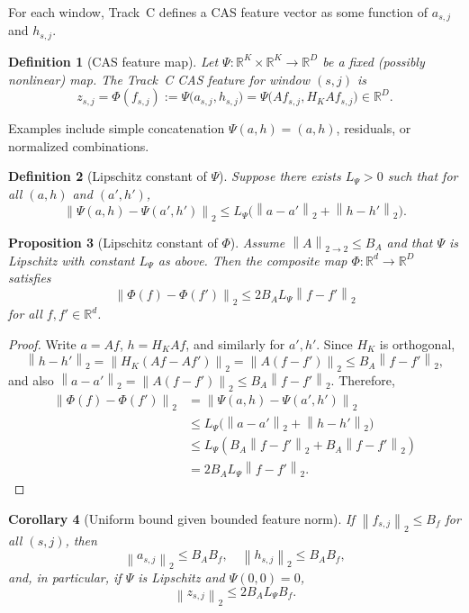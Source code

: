 \documentclass[11pt]{article}
\newtheorem{definition}{Definition}[section]
\newtheorem{proposition}[definition]{Proposition}
\newtheorem{corollary}[definition]{Corollary}
\newcommand{\R}{\mathbb{R}}
\newcommand{\norm}[1]{\left\lVert #1 \right\rVert}
\begin{document}
For each window, Track~C defines a CAS feature vector as some function of \(a_{s,j}\) and \(h_{s,j}\).

\begin{definition}[CAS feature map]
Let \(\Psi : \R^K \times \R^K \to \R^D\) be a fixed (possibly nonlinear) map.
The Track~C CAS feature for window \((s,j)\) is
\[
  z_{s,j} = \Phi(f_{s,j}) := \Psi\bigl(a_{s,j}, h_{s,j}\bigr)
  = \Psi\bigl(A f_{s,j}, H_K A f_{s,j}\bigr) \in \R^D.
\]
\end{definition}

Examples include simple concatenation \(\Psi(a,h) = (a,h)\), residuals, or normalized combinations.

\begin{definition}[Lipschitz constant of \(\Psi\)]
Suppose there exists \(L_\Psi > 0\) such that for all \((a,h)\) and \((a',h')\),
\[
  \norm{\Psi(a,h) - \Psi(a',h')}_2
  \le L_\Psi \bigl( \norm{a-a'}_2 + \norm{h-h'}_2 \bigr).
\]
\end{definition}

\begin{proposition}[Lipschitz constant of \(\Phi\)]
Assume \(\norm{A}_{2\to2} \le B_A\) and that \(\Psi\) is Lipschitz with constant \(L_\Psi\) as above.
Then the composite map \(\Phi : \R^d \to \R^D\) satisfies
\[
  \norm{\Phi(f) - \Phi(f')}_2 \le 2 B_A L_\Psi \norm{f - f'}_2
\]
for all \(f,f' \in \R^d\).
\end{proposition}

\begin{proof}
Write \(a = A f\), \(h = H_K A f\), and similarly for \(a',h'\).
Since \(H_K\) is orthogonal,
\[
  \norm{h - h'}_2 = \norm{H_K(A f - A f')}_2 = \norm{A(f-f')}_2 \le B_A \norm{f-f'}_2,
\]
and also \(\norm{a - a'}_2 = \norm{A(f-f')}_2 \le B_A \norm{f-f'}_2\).
Therefore,
\begin{align*}
  \norm{\Phi(f) - \Phi(f')}_2
  &= \norm{\Psi(a,h) - \Psi(a',h')}_2 \\
  &\le L_\Psi \bigl( \norm{a-a'}_2 + \norm{h-h'}_2 \bigr) \\
  &\le L_\Psi (B_A \norm{f-f'}_2 + B_A \norm{f-f'}_2) \\
  &= 2 B_A L_\Psi \norm{f-f'}_2.
\end{align*}
\end{proof}

\begin{corollary}[Uniform bound given bounded feature norm]
If \(\norm{f_{s,j}}_2 \le B_f\) for all \((s,j)\), then
\[
  \norm{a_{s,j}}_2 \le B_A B_f, \quad
  \norm{h_{s,j}}_2 \le B_A B_f,
\]
and, in particular, if \(\Psi\) is Lipschitz and \(\Psi(0,0) = 0\),
\[
  \norm{z_{s,j}}_2 \le 2 B_A L_\Psi B_f.
\]
\end{corollary}
\end{document}
